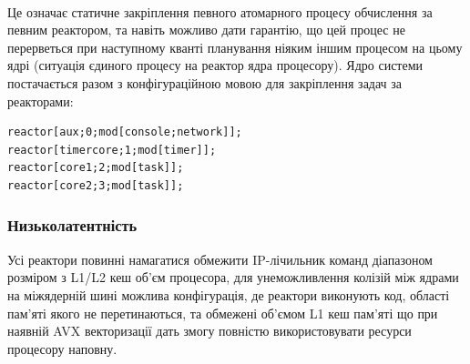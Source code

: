 \paragraph{}
Це означає статичне закріплення певного атомарного процесу
обчислення за певним реактором, та навіть можливо дати гарантію, що
цей процес не перерветься при наступному кванті планування
ніяким іншим процесом на цьому ядрі (ситуація єдиного процесу
на реактор ядра процесору). Ядро системи постачається разом з конфігураційною
мовою для закріплення задач за реакторами:
\begin{lstlisting}
reactor[aux;0;mod[console;network]];
reactor[timercore;1;mod[timer]];
reactor[core1;2;mod[task]];
reactor[core2;3;mod[task]];
\end{lstlisting}

\subsubsection{Низьколатентність}
Усі реактори повинні намагатися обмежити IP-лічильник команд
діапазоном розміром з L1/L2 кеш об'єм процесора, для унеможливлення
колізій між ядрами на міжядерній шині можлива конфігурація, де
реактори виконують код, області пам'яті якого не перетинаються,
та обмежені об'ємом L1 кеш пам'яті що при наявній AVX векторизації
дать змогу повністю використовувати ресурси процесору наповну.

\newpage
